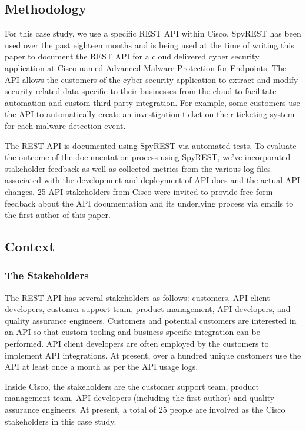\documentclass[10pt, conference]{IEEEtran}
\begin{document}
\subsection{Methodology}
For this case study, we use a specific REST API within Cisco. SpyREST has been used over the past eighteen months and is being used at the time of writing this paper to document the REST API for a cloud delivered cyber security application at Cisco named Advanced Malware Protection for Endpoints. The API allows the customers of the cyber security application to extract and modify security related data specific to their businesses from the cloud to facilitate automation and custom third-party integration. For example, some customers use the API to automatically create an investigation ticket on their ticketing system for each malware detection event.

The REST API is documented using SpyREST via automated tests. To evaluate the outcome of the documentation process using SpyREST, we've incorporated stakeholder feedback as well as collected metrics from the various log files associated with the development and deployment of API docs and the actual API changes. 25 API stakeholders from Cisco were invited to provide free form feedback about the API documentation and its underlying process via emails to the first author of this paper.

\subsection{Context}
\subsubsection{The Stakeholders} %
The REST API has several stakeholders as follows: customers, API client developers, customer support team, product management, API developers, and quality assurance engineers. Customers and potential customers are interested in an API so that custom tooling and business specific integration can be performed. API client developers are often employed by the customers to implement API integrations. At present, over a hundred unique customers use the API at least once a month as per the API usage logs.

Inside Cisco, the stakeholders are the customer support team, product management team, API developers (including the first author) and quality assurance engineers. At present, a total of 25 people are involved as the Cisco stakeholders in this case study.
\end{document}
